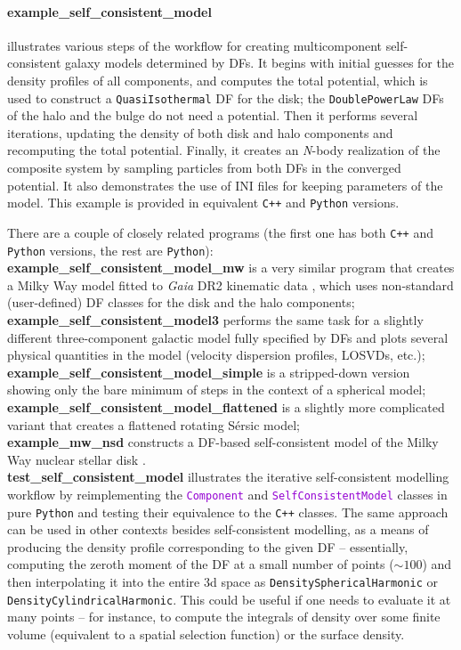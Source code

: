 \documentclass[12pt]{article}
\newcommand{\Nbody}{\textsl{N}-body\xspace}
\newcommand{\Cpp}  {\texttt{C++}\xspace}
\newcommand{\Python}{\texttt{Python}\xspace}
\newcommand{\ttt}[1]{\textcolor{darkviolet}{\texttt{#1}}}
\newcommand{\ppp}[1]{\textcolor{darkolive} {\texttt{#1}}}
\let\oldparagraph\paragraph
\renewcommand{\paragraph}[1]{\vspace{-2mm}\oldparagraph{#1}}
\begin{document}
\paragraph{example_self_consistent_model} \label{sec:ExampleSCM} illustrates various steps of the workflow for creating multicomponent self-consistent galaxy models determined by DFs. It begins with initial guesses for the density profiles of all components, and computes the total potential, which is used to construct a \ppp{QuasiIsothermal} DF for the disk; the \ppp{DoublePowerLaw} DFs of the halo and the bulge do not need a potential. Then it performs several iterations, updating the density of both disk and halo components and recomputing the total potential. Finally, it creates an \Nbody realization of the composite system by sampling particles from both DFs in the converged potential. It also demonstrates the use of INI files for keeping parameters of the model. This example is provided in equivalent \Cpp and \Python versions.

There are a couple of closely related programs (the first one has both \Cpp and \Python versions, the rest are \Python):\\
\textbf{example_self_consistent_model_mw} is a very similar program that creates a Milky Way model fitted to \textit{Gaia} DR2 kinematic data \cite{BinneyVasiliev2023}, which uses non-standard (user-defined) DF classes for the disk and the halo components;\\
\textbf{example_self_consistent_model3} performs the same task for a slightly different three-component galactic model fully specified by DFs and plots several physical quantities in the model (velocity dispersion profiles, LOSVDs, etc.);\\
\textbf{example_self_consistent_model_simple} is a stripped-down version showing only the bare minimum of steps in the context of a spherical model;\\
\textbf{example_self_consistent_model_flattened} is a slightly more complicated variant that creates a flattened rotating S\'ersic model;\\
\textbf{example_mw_nsd} constructs a DF-based self-consistent model of the Milky Way nuclear stellar disk \cite{Sormani2022a}.\\
\textbf{test_self_consistent_model} illustrates the iterative self-consistent modelling workflow by reimplementing the \ttt{Component} and \ttt{SelfConsistentModel} classes in pure \Python and testing their equivalence to the \Cpp classes. The same approach can be used in other contexts besides self-consistent modelling, as a means of producing the density profile corresponding to the given DF -- essentially, computing the zeroth moment of the DF at a small number of points ($\sim 100$) and then interpolating it into the entire 3d space as \ppp{DensitySphericalHarmonic} or \ppp{DensityCylindricalHarmonic}. This could be useful if one needs to evaluate it at many points -- for instance, to compute the integrals of density over some finite volume (equivalent to a spatial selection function) or the surface density.
\end{document}
